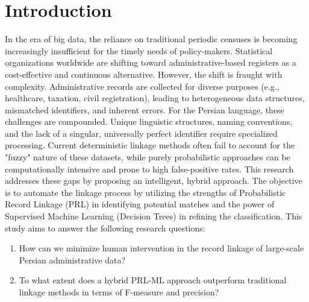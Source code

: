 \documentclass[twoside]{article}
\begin{document}
\section{Introduction}
In the era of big data, the reliance on traditional periodic censuses is becoming increasingly insufficient for the timely needs of policy-makers. Statistical organizations worldwide are shifting toward administrative-based registers as a cost-effective and continuous alternative. However, the shift is fraught with complexity. Administrative records are collected for diverse purposes (e.g., healthcare, taxation, civil registration), leading to heterogeneous data structures, mismatched identifiers, and inherent errors.
For the Persian language, these challenges are compounded. Unique linguistic structures, naming conventions, and the lack of a singular, universally perfect identifier require specialized processing. Current deterministic linkage methods often fail to account for the "fuzzy" nature of these datasets, while purely probabilistic approaches can be computationally intensive and prone to high false-positive rates.
This research addresses these gaps by proposing an intelligent, hybrid approach. The objective is to automate the linkage process by utilizing the strengths of Probabilistic Record Linkage (PRL) in identifying potential matches and the power of Supervised Machine Learning (Decision Trees) in refining the classification. This study aims to answer the following research questions:
\begin{enumerate}
	\item How can we minimize human intervention in the record linkage of large-scale Persian administrative data?
	\item To what extent does a hybrid PRL-ML approach outperform traditional linkage methods in terms of F-measure and precision?
\end{enumerate}
\end{document}
